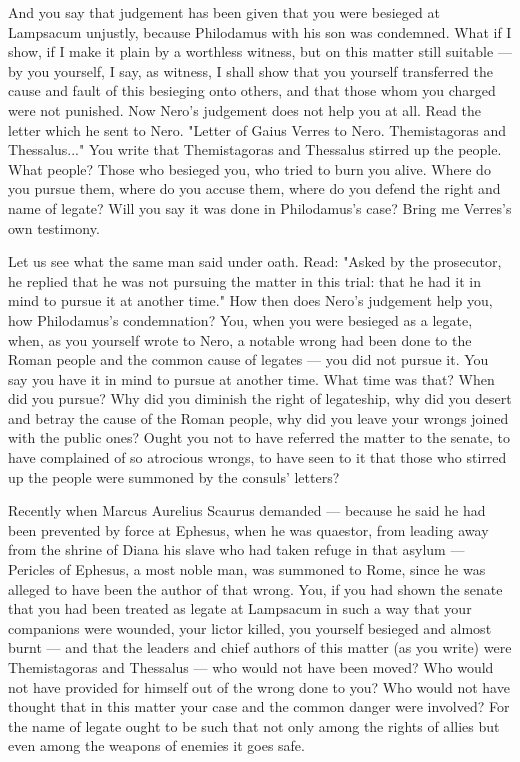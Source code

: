  And you say that judgement has been given that you were besieged at Lampsacum unjustly, because Philodamus with his son was condemned. What if I show, if I make it plain by a worthless witness, but on this matter still suitable --- by you yourself, I say, as witness, I shall show that you yourself transferred the cause and fault of this besieging onto others, and that those whom you charged were not punished. Now Nero's judgement does not help you at all. Read the letter which he sent to Nero. "Letter of Gaius Verres to Nero. Themistagoras and Thessalus..." You write that Themistagoras and Thessalus stirred up the people. What people? Those who besieged you, who tried to burn you alive. Where do you pursue them, where do you accuse them, where do you defend the right and name of legate? Will you say it was done in Philodamus's case? Bring me Verres's own testimony.

 Let us see what the same man said under oath. Read: "Asked by the prosecutor, he replied that he was not pursuing the matter in this trial: that he had it in mind to pursue it at another time." How then does Nero's judgement help you, how Philodamus's condemnation? You, when you were besieged as a legate, when, as you yourself wrote to Nero, a notable wrong had been done to the Roman people and the common cause of legates --- you did not pursue it. You say you have it in mind to pursue at another time. What time was that? When did you pursue? Why did you diminish the right of legateship, why did you desert and betray the cause of the Roman people, why did you leave your wrongs joined with the public ones? Ought you not to have referred the matter to the senate, to have complained of so atrocious wrongs, to have seen to it that those who stirred up the people were summoned by the consuls' letters?

 Recently when Marcus Aurelius Scaurus demanded --- because he said he had been prevented by force at Ephesus, when he was quaestor, from leading away from the shrine of Diana his slave who had taken refuge in that asylum --- Pericles of Ephesus, a most noble man, was summoned to Rome, since he was alleged to have been the author of that wrong. You, if you had shown the senate that you had been treated as legate at Lampsacum in such a way that your companions were wounded, your lictor killed, you yourself besieged and almost burnt --- and that the leaders and chief authors of this matter (as you write) were Themistagoras and Thessalus --- who would not have been moved? Who would not have provided for himself out of the wrong done to you? Who would not have thought that in this matter your case and the common danger were involved? For the name of legate ought to be such that not only among the rights of allies but even among the weapons of enemies it goes safe.

